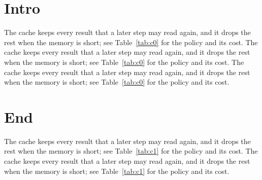 \documentclass{article}
\begin{document}
\section{Intro}
The cache keeps every result that a later step may read again, and it drops the rest when the memory is short; see Table~\ref{tab:c0} for the policy and its cost. The cache keeps every result that a later step may read again, and it drops the rest when the memory is short; see Table~\ref{tab:c0} for the policy and its cost. The cache keeps every result that a later step may read again, and it drops the rest when the memory is short; see Table~\ref{tab:c0} for the policy and its cost. 



\section{End}
The cache keeps every result that a later step may read again, and it drops the rest when the memory is short; see Table~\ref{tab:c1} for the policy and its cost. The cache keeps every result that a later step may read again, and it drops the rest when the memory is short; see Table~\ref{tab:c1} for the policy and its cost. 
\end{document}
